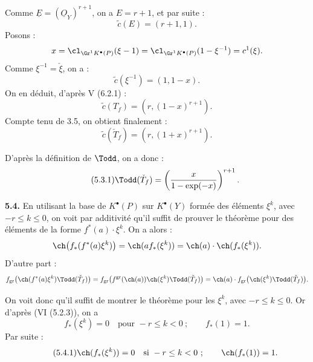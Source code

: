 
Comme \(\underline{E}=(\underline{O}_Y)^{r+1}\), on a \(E=r+1\), et par suite :
\[
 \widetilde c(E)=(r+1,1).
\]
Posons :
\[
 x=\cl_{\Gr^1K^{\bullet}(P)}(\xi-1)
 =
 \cl_{\Gr^1K^{\bullet}(P)}(1-\xi^{-1})
 =
 c^1(\xi).
\]
Comme \(\xi^{-1}=\check \xi\), on a :
\[
 \widetilde c(\xi^{-1})=(1,1-x).
\]
On en déduit, d'après V (6.2.1) :
\[
 \widetilde c(T_f)=(r,(1-x)^{r+1}).
\]
Compte tenu de 3.5, on obtient finalement :
\[
 \widetilde c(\check T_f)=(r,(1+x)^{r+1}).
\]

D'après la définition de \(\Todd\), on a donc :
\begin{equation}\tag{5.3.1}
 \Todd(\check T_f)=
 \left(\frac{x}{1-\exp(-x)}\right)^{r+1}.
\end{equation}

\textbf{5.4.} En utilisant la base de \(K^{\bullet}(P)\) sur \(K^{\bullet}(Y)\) formée des éléments \(\xi^k\), avec \(-r\leq k\leq0\), on voit par additivité qu'il suffit de prouver le théorème pour des éléments de la forme \(f^*(a)\cdot\xi^k\). On a alors :
\[
 \ch\bigl(f_*(f^*(a)\xi^k)\bigr)
 =
 \ch(a f_*(\xi^k))
 =
 \ch(a)\cdot\ch(f_*(\xi^k)).
\]
D'autre part :
\[
 f_{\mathrm{gr}}\bigl(\ch(f^*(a)\xi^k)\Todd(\check T_f)\bigr)
 =
 f_{\mathrm{gr}}\bigl(f^{\mathrm{gr}}(\ch(a))\ch(\xi^k)\Todd(\check T_f)\bigr)
 =
 \ch(a)\cdot f_{\mathrm{gr}}\bigl(\ch(\xi^k)\Todd(\check T_f)\bigr).
\]

On voit donc qu'il suffit de montrer le théorème pour les \(\xi^k\), avec \(-r\leq k\leq0\). Or d'après (VI (5.2.3)), on a
\[
 f_*(\xi^k)=0\quad\text{pour }-r\leq k<0~;\qquad f_*(1)=1.
\]
Par suite :
\begin{equation}\tag{5.4.1}
 \ch(f_*(\xi^k))=0\quad\text{si }-r\leq k<0~;\qquad
 \ch(f_*(1))=1.
\end{equation}

